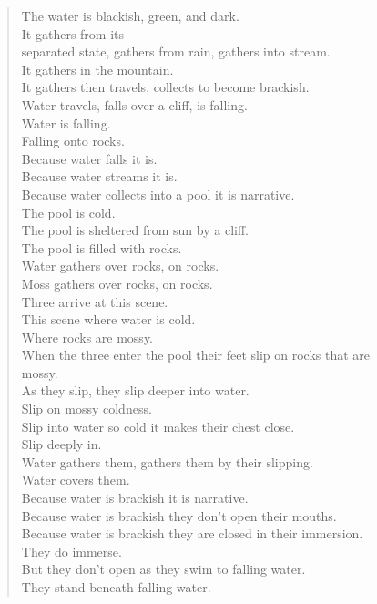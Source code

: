 \documentclass[
]{memoir}
\begin{document}
\begin{verse}
The water is blackish, green, and dark.\\
It gathers from its\\
separated state, gathers from rain, gathers into stream.\\
It gathers in the mountain.\\
It gathers then travels, collects to become brackish.\\
Water travels, falls over a cliff, is falling.\\
Water is falling.\\
Falling onto rocks.\\
Because water falls it is.\\
Because water streams it is.\\
Because water collects into a pool it is narrative.\\
The pool is cold.\\
The pool is sheltered from sun by a cliff.\\
The pool is filled with rocks.\\
Water gathers over rocks, on rocks.\\
Moss gathers over rocks, on rocks.\\
Three arrive at this scene.\\
This scene where water is cold.\\
Where rocks are mossy.\\
When the three enter the pool their feet slip on rocks that are\\
mossy.\\
As they slip, they slip deeper into water.\\
Slip on mossy coldness.\\
Slip into water so cold it makes their chest close.\\
Slip deeply in.\\
Water gathers them, gathers them by their slipping.\\
Water covers them.\\
Because water is brackish it is narrative.\\
Because water is brackish they don’t open their mouths.\\
Because water is brackish they are closed in their immersion.\\
They do immerse.\\
But they don’t open as they swim to falling water.\\
They stand beneath falling water.\\

\end{verse}
\end{document}
